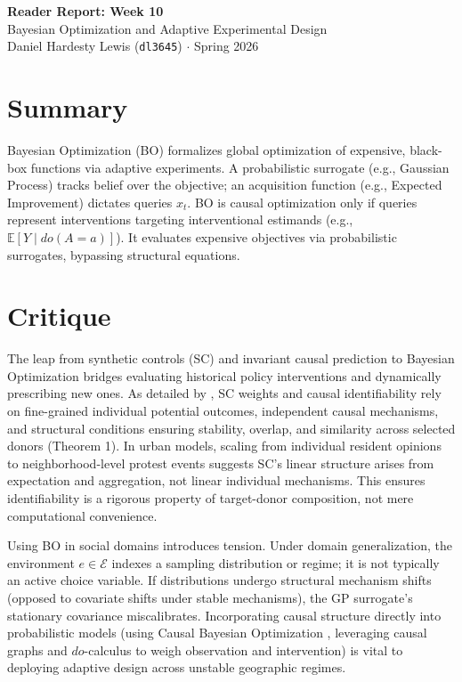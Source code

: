 \documentclass[11pt,twoside]{article}
\begin{document}
\vspace*{-1.5cm}
\begin{center}
{\Large \textbf{Reader Report: Week 10}} \\
\vspace{0.2em}
{\large Bayesian Optimization and Adaptive Experimental Design} \\
\vspace{0.3em}
Daniel Hardesty Lewis (\texttt{dl3645}) $\cdot$ Spring 2026
\end{center}
\vspace{-1.5em}
\thispagestyle{fancy}

\section*{Summary}
Bayesian Optimization (BO) formalizes global optimization of expensive, black-box functions via adaptive experiments. A probabilistic surrogate (e.g., Gaussian Process) tracks belief over the objective; an acquisition function (e.g., Expected Improvement) dictates queries $x_t$. BO is causal optimization only if queries represent interventions targeting interventional estimands (e.g., $\mathbb{E}[Y \mid do(A=a)]$). It evaluates expensive objectives via probabilistic surrogates, bypassing structural equations.

\section*{Critique}
The leap from synthetic controls (SC) and invariant causal prediction to Bayesian Optimization bridges evaluating historical policy interventions and dynamically prescribing new ones. As detailed by \citet{shi2022sc}, SC weights and causal identifiability rely on fine-grained individual potential outcomes, independent causal mechanisms, and structural conditions ensuring stability, overlap, and similarity across selected donors (Theorem 1). In urban models, scaling from individual resident opinions to neighborhood-level protest events suggests SC's linear structure arises from expectation and aggregation, not linear individual mechanisms. This ensures identifiability is a rigorous property of target-donor composition, not mere computational convenience.

Using BO in social domains introduces tension. Under domain generalization, the environment $e \in \mathcal{E}$ indexes a sampling distribution or regime; it is not typically an active choice variable. If distributions undergo structural mechanism shifts (opposed to covariate shifts under stable mechanisms), the GP surrogate's stationary covariance miscalibrates. Incorporating causal structure directly into probabilistic models (using Causal Bayesian Optimization \citep{aglietti2020cbo}, leveraging causal graphs and $do$-calculus to weigh observation and intervention) is vital to deploying adaptive design across unstable geographic regimes.
\end{document}
